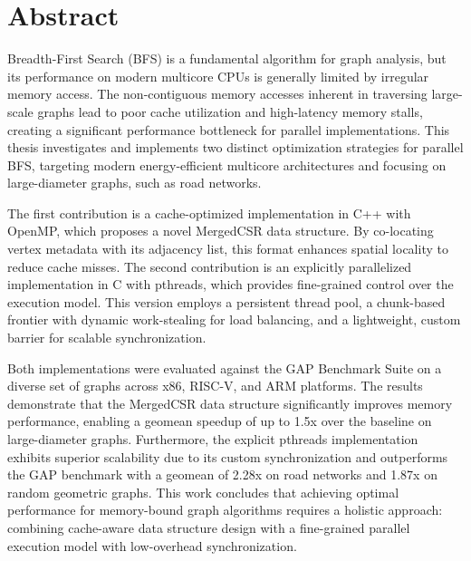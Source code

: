 \chapter*{Abstract}
\label{cha:abtract}
Breadth-First Search (BFS) is a fundamental algorithm for graph analysis, but its performance on modern multicore CPUs is generally limited by irregular memory access. The non-contiguous memory accesses inherent in traversing large-scale graphs lead to poor cache utilization and high-latency memory stalls, creating a significant performance bottleneck for parallel implementations. This thesis investigates and implements two distinct optimization strategies for parallel BFS, targeting modern energy-efficient multicore architectures and focusing on large-diameter graphs, such as road networks.

The first contribution is a cache-optimized implementation in C++ with OpenMP, which proposes a novel MergedCSR data structure. By co-locating vertex metadata with its adjacency list, this format enhances spatial locality to reduce cache misses. The second contribution is an explicitly parallelized implementation in C with pthreads, which provides fine-grained control over the execution model. This version employs a persistent thread pool, a chunk-based frontier with dynamic work-stealing for load balancing, and a lightweight, custom barrier for scalable synchronization.

Both implementations were evaluated against the GAP Benchmark Suite on a diverse set of graphs across x86, RISC-V, and ARM platforms. The results demonstrate that the MergedCSR data structure significantly improves memory performance, enabling a geomean speedup of up to 1.5x over the baseline on large-diameter graphs. Furthermore, the explicit pthreads implementation exhibits superior scalability due to its custom synchronization and outperforms the GAP benchmark with a geomean of 2.28x on road networks and 1.87x on random geometric graphs. This work concludes that achieving optimal performance for memory-bound graph algorithms requires a holistic approach: combining cache-aware data structure design with a fine-grained parallel execution model with low-overhead synchronization.